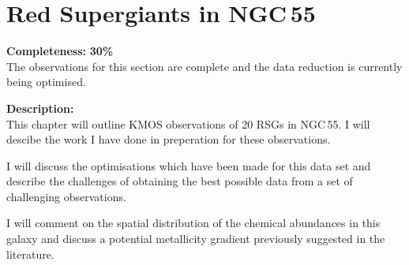 \chapter{Red Supergiants in NGC\,55}

\textbf{Completeness:} \textbf{30\%} \\
The observations for this section are complete and the data reduction is
currently being optimised.

\textbf{Description:} \\
This chapter will outline KMOS observations of 20 RSGs in NGC\,55.
I will descibe the work I have done in preperation for these observations.

I will discuss the optimisations which have been made for this data set and
describe the challenges of obtaining the best possible data from a set of
challenging observations.

I will comment on the spatial distribution of the chemical abundances in this
galaxy and discuss a potential metallicity gradient previously suggested in
the literature.

